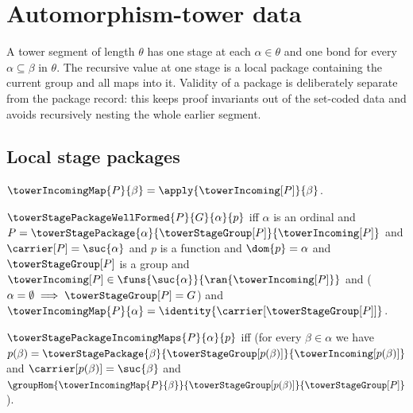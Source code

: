 




\section{Automorphism-tower data}

A tower segment of length $\theta$ has one stage at each
$\alpha\in\theta$ and one bond for every $\alpha\subseteq\beta$ in
$\theta$.  The recursive value at one stage is a local package containing
the current group and all maps into it.  Validity of a package is deliberately
separate from the package record: this keeps proof invariants out of the
set-coded data and avoids recursively nesting the whole earlier segment.

\subsection{Local stage packages}

\begin{definition}\label{tower_incoming_map}
    $\towerIncomingMap{P}{\beta}=\apply{\towerIncoming[P]}{\beta}$.
\end{definition}

\begin{definition}\label{tower_stage_package_well_formed}
    $\towerStagePackageWellFormed{P}{G}{\alpha}{p}$ iff
        $\alpha$ is an ordinal and
        $P=\towerStagePackage{\alpha}
            {\towerStageGroup[P]}{\towerIncoming[P]}$ and
        $\carrier[P]=\suc{\alpha}$ and
        $p$ is a function and $\dom{p}=\alpha$ and
        $\towerStageGroup[P]$ is a group and
        $\towerIncoming[P]\in
            \funs{\suc{\alpha}}{\ran{\towerIncoming[P]}}$ and
        ($\alpha=\emptyset\implies\towerStageGroup[P]=G$) and
        $\towerIncomingMap{P}{\alpha}=
            \identity{\carrier[\towerStageGroup[P]]}$.
\end{definition}

\begin{definition}\label{tower_stage_package_incoming_maps}
    $\towerStagePackageIncomingMaps{P}{\alpha}{p}$ iff
        (for every $\beta\in\alpha$ we have
            $p(\beta)=\towerStagePackage{\beta}
                {\towerStageGroup[p(\beta)]}{\towerIncoming[p(\beta)]}$ and
            $\carrier[p(\beta)]=\suc{\beta}$ and
            $\groupHom
                {\towerIncomingMap{P}{\beta}}
                {\towerStageGroup[p(\beta)]}
                {\towerStageGroup[P]}$).
\end{definition}

